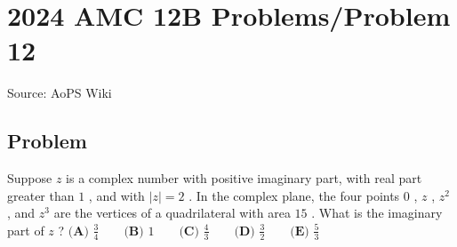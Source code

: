 \documentclass[12pt]{article}
\begin{document}
\section*{{2024 AMC 12B Problems/Problem 12}}
Source: AoPS Wiki

\subsection*{Problem}
Suppose $z$ is a complex number with positive imaginary part, with real part greater than $1$ , and with $|z| = 2$ . In the complex plane, the four points $0$ , $z$ , $z^{2}$ , and $z^{3}$ are the vertices of a quadrilateral with area $15$ . What is the imaginary part of $z$ ? $\textbf{(A) }\frac{3}{4}\qquad\textbf{(B) }1\qquad\textbf{(C) }\frac{4}{3}\qquad\textbf{(D) }\frac{3}{2}\qquad\textbf{(E) }\frac{5}{3}$
\end{document}
